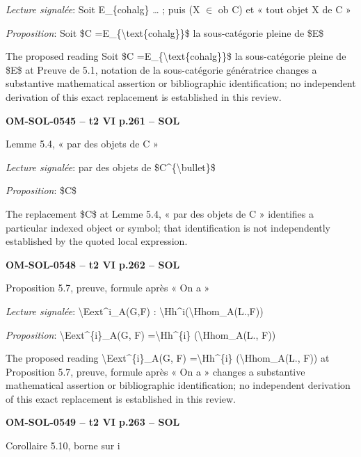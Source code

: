 \emph{Lecture signalée}: Soit E\_\{cohalg\} … ; puis (X \ensuremath{\in} ob C) et « tout objet X de C »\par
\emph{Proposition}: Soit \$C =\allowbreak  E\_\{\textbackslash{}text\{cohalg\}\}\$ la sous-catégorie pleine de \$E\$\par
The proposed reading Soit \$C =\allowbreak  E\_\{\textbackslash{}text\{cohalg\}\}\$ la sous-catégorie pleine de \$E\$ at Preuve de 5.1, notation de la sous-catégorie génératrice changes a substantive mathematical assertion or bibliographic identification; no independent derivation of this exact replacement is established in this review.\par
\par\noindent\textbf{OM-SOL-0545 -- t2 VI p.261 -- SOL}\par
Lemme 5.4, « par des objets de C »\par
\emph{Lecture signalée}: par des objets de \$C\textasciicircum{}\{\textbackslash{}bullet\}\$\par
\emph{Proposition}: \$C\$\par
The replacement \$C\$ at Lemme 5.4, « par des objets de C » identifies a particular indexed object or symbol; that identification is not independently established by the quoted local expression.\par
\par\noindent\textbf{OM-SOL-0548 -- t2 VI p.262 -- SOL}\par
Proposition 5.7, preuve, formule après « On a »\par
\emph{Lecture signalée}: \textbackslash{}Eext\textasciicircum{}i\_A(G,F) : \textbackslash{}Hh\textasciicircum{}i(\textbackslash{}Hhom\_A(L.,F))\par
\emph{Proposition}: \textbackslash{}Eext\textasciicircum{}\{i\}\_A(G, F) =\allowbreak  \textbackslash{}Hh\textasciicircum{}\{i\} (\textbackslash{}Hhom\_A(L., F))\par
The proposed reading \textbackslash{}Eext\textasciicircum{}\{i\}\_A(G, F) =\allowbreak  \textbackslash{}Hh\textasciicircum{}\{i\} (\textbackslash{}Hhom\_A(L., F)) at Proposition 5.7, preuve, formule après « On a » changes a substantive mathematical assertion or bibliographic identification; no independent derivation of this exact replacement is established in this review.\par
\par\noindent\textbf{OM-SOL-0549 -- t2 VI p.263 -- SOL}\par
Corollaire 5.10, borne sur i\par
